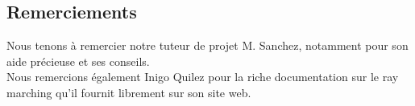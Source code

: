 \documentclass[a4paper,11pt,twoside]{article}
\begin{document}
\dosecttoc{} %
\cleardoublepage


\thispagestyle{empty} %
\subsection*{Remerciements}
Nous tenons à remercier notre tuteur de projet M. Sanchez, notamment pour son aide précieuse et ses conseils. \\
Nous remercions également Inigo Quilez pour la riche documentation sur le ray marching qu'il fournit librement sur son site web.
\clearpage

\thispagestyle{empty} %
\setcounter{secnumdepth}{3}
\tableofcontents
\clearpage

\setcounter{page}{1}



\clearpage

\clearpage

\clearpage

\clearpage


\clearpage



\clearpage

\clearpage
\appendix
\renewcommand{\stctitle}{}                          %
\renewcommand\thesubsection{A\arabic{subsection}}   %
\renewcommand{\stcSSfont}{}                         %

\secttoc
\clearpage
{}




\end{document}
